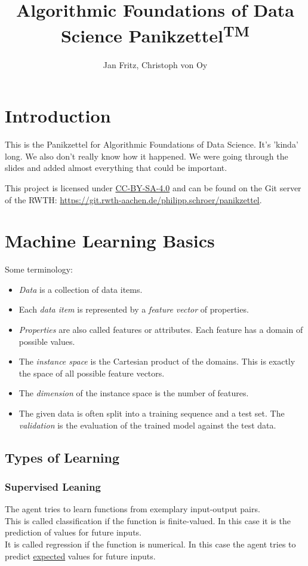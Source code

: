 \documentclass[english]{panikzettel}
\title{Algorithmic Foundations of Data Science Panikzettel\textsuperscript{\footnotesize TM}}
\author{Jan Fritz, Christoph von Oy}
\begin{document}
\maketitle

\tableofcontents

\section{Introduction}
This is the Panikzettel for Algorithmic Foundations of Data Science. It's 'kinda' long. We also don't really know how it happened. We were going through the slides and added almost everything that could be important.

This project is licensed under \href{https://creativecommons.org/licenses/by-sa/4.0/}{CC-BY-SA-4.0} and can be found on the Git server of the RWTH: \url{https://git.rwth-aachen.de/philipp.schroer/panikzettel}.

\section{Machine Learning Basics}
Some terminology:
\begin{itemize}
\item \emph{Data} is a collection of data items.
\item Each \emph{data item} is represented by a \emph{feature vector} of properties.
\item \emph{Properties} are also called features or attributes. Each feature has a domain of possible values.
\item The \emph{instance space} is the Cartesian product of the domains. This is exactly the space of all possible feature vectors.
\item The \emph{dimension} of the instance space is the number of features.
\item The given data is often split into a training sequence and a test set. The \emph{validation} is the evaluation of the trained model against the test data.
\end{itemize}

\subsection{Types of Learning}
\subsubsection{Supervised Leaning}
The agent tries to learn functions from exemplary input-output pairs.\\
This is called classification if the function is finite-valued. In this case it is the prediction of values for future inputs.\\
It is called regression if the function is numerical. In this case the agent tries to predict \underline{expected} values for future inputs.
\end{document}
